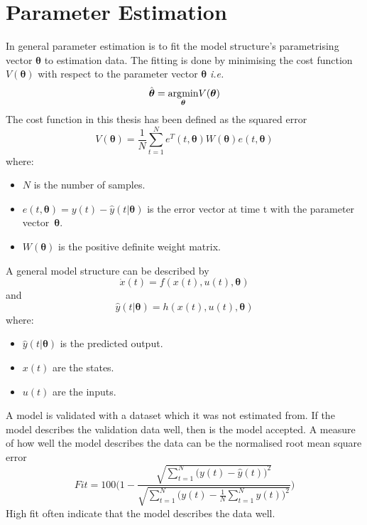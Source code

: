 \section{Parameter Estimation} 
In general parameter estimation is to fit the model structure's parametrising vector $\boldsymbol{\theta}$ to estimation data. The fitting is done by minimising the cost function $V(\boldsymbol{\theta})$ with respect to the parameter vector $\boldsymbol{\theta}$ \emph{i.e.}
\begin{equation}
\hat{\boldsymbol{\theta}} = \underset{\boldsymbol{\theta}}{\operatorname*{\arg\!\min}} V(\boldsymbol{\theta})
\end{equation}
The cost function in this thesis has been defined as the squared error
\begin{equation}
    V(\boldsymbol{\theta}) = \frac{1}{N} \sum_{t=1}^{N} e^T(t,\boldsymbol{\theta}) W(\boldsymbol{\theta})  e(t,\boldsymbol{\theta})
\end{equation}
where:
\begin{itemize}
    \item $N$ is the number of samples.
    \item $e(t,\boldsymbol{\theta}) = y(t) - \hat{y}(t|\boldsymbol{\theta})$ is the error vector at time t with the parameter vector~$\boldsymbol{\theta}$.
    \item $W(\boldsymbol{\theta})$ is the positive definite weight matrix.
\end{itemize}

A general model structure can be described by
\begin{equation}
\dot{x}(t) = f(x(t), u(t), \boldsymbol{\theta})
\end{equation}
and
\begin{equation}
\hat{y}(t|\boldsymbol{\theta}) = h(x(t), u(t), \boldsymbol{\theta})
\end{equation}
 where:
 \begin{itemize}
  \item $\hat{y}(t|\boldsymbol{\theta})$ is the predicted output.
  \item $x(t)$ are the states. 
  \item $u(t)$ are the inputs. 
 \end{itemize}

A model is validated with a dataset which it was not estimated from. If the model describes the validation data well, then is the model accepted. A measure of how well the model describes the data can be the normalised root mean square error
\begin{equation}
Fit = 100 \Biggr(1 - \frac{\sqrt{\sum\limits_{t=1}^N \bigr(y(t) - \hat{y}(t)\bigl)^2}}{\sqrt{\sum\limits_{t=1}^N \bigr(y(t)-\frac{1}{N}\sum\limits_{t=1}^N y(t)\bigl)^2}}\Biggl)
\end{equation} 
High fit often indicate that the model describes the data well. 
